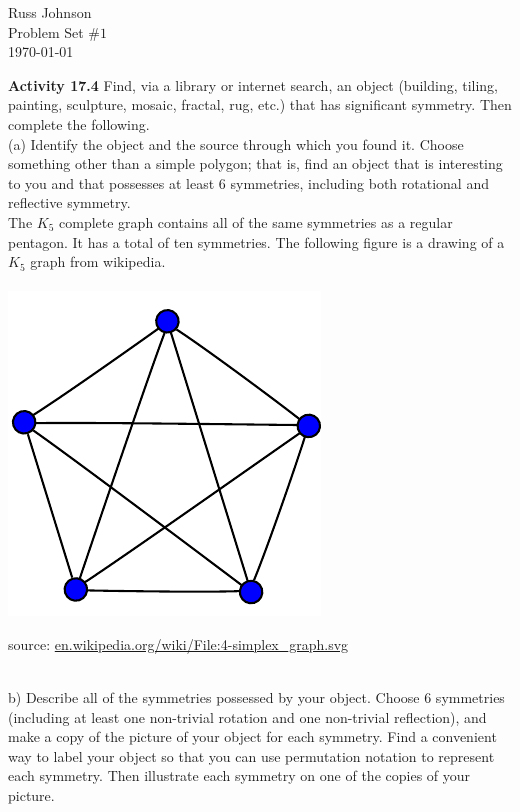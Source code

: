 \documentclass[11pt,a4paper]{article}
\begin{document}
\begin{flushright}
Russ Johnson\\
Problem Set $\#1$\\
\today\\
\end{flushright}

{\bf Activity 17.4} Find, via a library or internet search, an object (building, tiling,
painting, sculpture, mosaic, fractal, rug, etc.) that has significant symmetry. Then
complete the following.
~\\
(a) Identify the object and the source through which you found it. Choose something other than a simple polygon; that is, find an object that is interesting to you and that possesses at least 6 symmetries, including both rotational and reflective symmetry.
~\\
The $K_5$ complete graph contains all of the same symmetries as a regular pentagon. It has a total of ten symmetries. The following figure is a drawing of a $K_5$ graph from wikipedia. \\
~\\
\includegraphics[scale=1]{./graphics/4-simplex_graph.pdf}
\begin{flushright}
source: \url{en.wikipedia.org/wiki/File:4-simplex_graph.svg}
\end{flushright}
~\\
b) Describe all of the symmetries possessed by your object. Choose 6 symmetries (including at least one non-trivial rotation and one non-trivial reflection), and make a copy of the picture of your object for each symmetry.
Find a convenient way to label your object so that you can use permutation notation to represent each symmetry. Then illustrate each symmetry on one of the copies of your picture.
\end{document}
